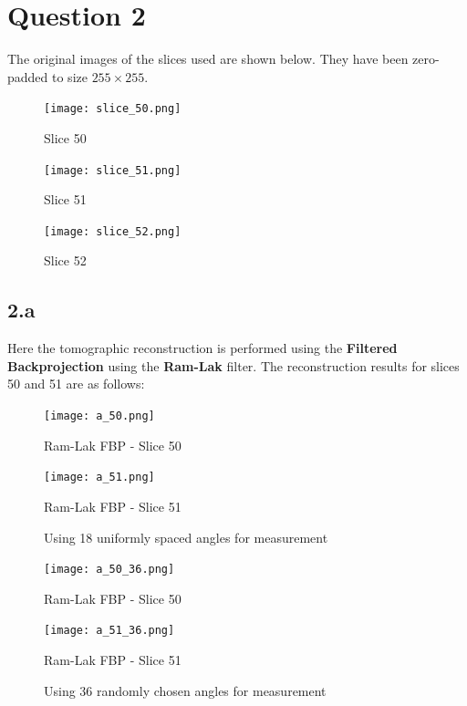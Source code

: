 \documentclass[12pt]{article}
\begin{document}
\section*{Question 2}
The original images of the slices used are shown below. They have been zero-padded to size $255\times255$.
\begin{figure}[ht]
	\centering
	\begin{minipage}[bt]{0.3\linewidth}
		\centering
		\texttt{[image: slice\_50.png]}
		\caption{Slice 50}
	\end{minipage}
	\begin{minipage}[bt]{0.3\linewidth}
		\centering
		\texttt{[image: slice\_51.png]}
		\caption{Slice 51}
	\end{minipage}
	\begin{minipage}[bt]{0.3\linewidth}
		\centering
		\texttt{[image: slice\_52.png]}
		\caption{Slice 52}
	\end{minipage}
\end{figure}

\subsection*{2.a}
Here the tomographic reconstruction is performed using the \textbf{Filtered Backprojection} using the \textbf{Ram-Lak} filter. The reconstruction results for slices 50 and 51 are as follows:
\begin{figure}[ht]
	\centering
	\begin{minipage}[bt]{0.5\linewidth}
		\centering
		\texttt{[image: a\_50.png]}
		\caption*{Ram-Lak FBP - Slice 50}
	\end{minipage}
	\begin{minipage}[bt]{0.4\linewidth}
		\centering
		\texttt{[image: a\_51.png]}
		\caption*{Ram-Lak FBP - Slice 51}
	\end{minipage}
\caption{Using 18 uniformly spaced angles for measurement}
\end{figure}
\begin{figure}[ht]
	\centering
	\begin{minipage}[bt]{0.5\linewidth}
		\centering
		\texttt{[image: a\_50\_36.png]}
		\caption*{Ram-Lak FBP - Slice 50}
	\end{minipage}
	\begin{minipage}[bt]{0.4\linewidth}
		\centering
		\texttt{[image: a\_51\_36.png]}
		\caption*{Ram-Lak FBP - Slice 51}
	\end{minipage}
	\caption{Using 36 randomly chosen angles for measurement}
\end{figure}
\end{document}
